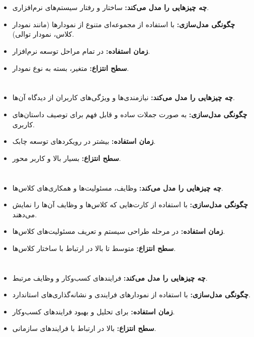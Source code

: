 \section*{}
\begin{itemize}
	\item \textbf{چه چیزهایی را مدل می‌کند:} ساختار و رفتار سیستم‌های نرم‌افزاری.
	\item \textbf{چگونگی مدل‌سازی:} با استفاده از مجموعه‌ای متنوع از نمودارها (مانند نمودار کلاس، نمودار توالی).
	\item \textbf{زمان استفاده:} در تمام مراحل توسعه نرم‌افزار.
	\item \textbf{سطح انتزاع:} متغیر، بسته به نوع نمودار.
\end{itemize}

\section*{}
\begin{itemize}
	\item \textbf{چه چیزهایی را مدل می‌کند:} نیازمندی‌ها و ویژگی‌های کاربران از دیدگاه آن‌ها.
	\item \textbf{چگونگی مدل‌سازی:} به صورت جملات ساده و قابل فهم برای توصیف داستان‌های کاربری.
	\item \textbf{زمان استفاده:} بیشتر در رویکردهای توسعه چابک.
	\item \textbf{سطح انتزاع:} بسیار بالا و کاربر محور.
\end{itemize}

\section*{}
\begin{itemize}
	\item \textbf{چه چیزهایی را مدل می‌کند:} وظایف، مسئولیت‌ها و همکاری‌های کلاس‌ها.
	\item \textbf{چگونگی مدل‌سازی:} با استفاده از کارت‌هایی که کلاس‌ها و وظایف آن‌ها را نمایش می‌دهند.
	\item \textbf{زمان استفاده:} در مرحله طراحی سیستم و تعریف مسئولیت‌های کلاس‌ها.
	\item \textbf{سطح انتزاع:} متوسط تا بالا در ارتباط با ساختار کلاس‌ها.
\end{itemize}

\section*{}
\begin{itemize}
	\item \textbf{چه چیزهایی را مدل می‌کند:} فرایندهای کسب‌وکار و وظایف مرتبط.
	\item \textbf{چگونگی مدل‌سازی:} با استفاده از نمودارهای فرایندی و نشانه‌گذاری‌های استاندارد.
	\item \textbf{زمان استفاده:} برای تحلیل و بهبود فرایندهای کسب‌وکار.
	\item \textbf{سطح انتزاع:} بالا در ارتباط با فرایندهای سازمانی.
\end{itemize}


